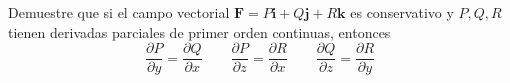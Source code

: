 \item Demuestre que si el campo vectorial $\mathbf{F} = P\mathbf{i} + Q\mathbf{j} + R\mathbf{k}$ es conservativo y $P, Q, R$ tienen derivadas parciales de primer orden continuas, entonces
    \[ \frac{\partial P}{\partial y} = \frac{\partial Q}{\partial x} \qquad \frac{\partial P}{\partial z} = \frac{\partial R}{\partial x} \qquad \frac{\partial Q}{\partial z} = \frac{\partial R}{\partial y} \]
